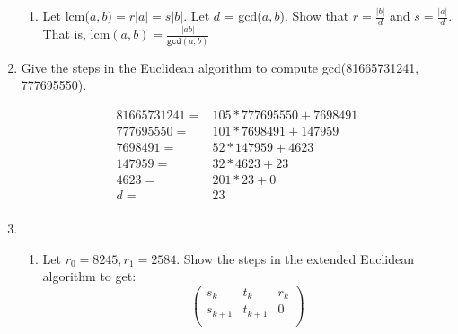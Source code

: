 \documentclass[11pt]{article}
\begin{document}
\begin{enumerate}
\begin{enumerate}
\item Let lcm($a,b) = r|a| = s|b|$.  Let $d$ = gcd($a,b$).  Show that $r = \tfrac{|b|}{d}$ and $s = \tfrac{|a|}{d}$.  That is, lcm$(a,b) = \tfrac{|ab|}{\mathtt{gcd}(a,b)}$
\end{enumerate}


\newpage %
\item Give the steps in the Euclidean algorithm to compute gcd(81665731241, 777695550).

\begin{align*}
81665731241 =& 105 * 777695550 + 7698491\\
777695550 =& 101 * 7698491 + 147959\\
7698491 =& 52 * 147959 + 4623\\
147959 =& 32 * 4623 + 23\\
4623 =& 201 * 23 + 0\\
d =& 23\\
\end{align*}

\newpage %
\item 
\begin{enumerate}
\item Let $r_0 = 8245, r_1 = 2584$.  Show the steps in the extended Euclidean algorithm to get:
\begin{equation*}
\left(
\begin{array}{ccc}
s_k & t_k & r_k \\
s_{k+1} & t_{k+1} & 0 \\
\end{array} \right)
\end{equation*}


\end{enumerate}
\end{enumerate}
\end{document}
